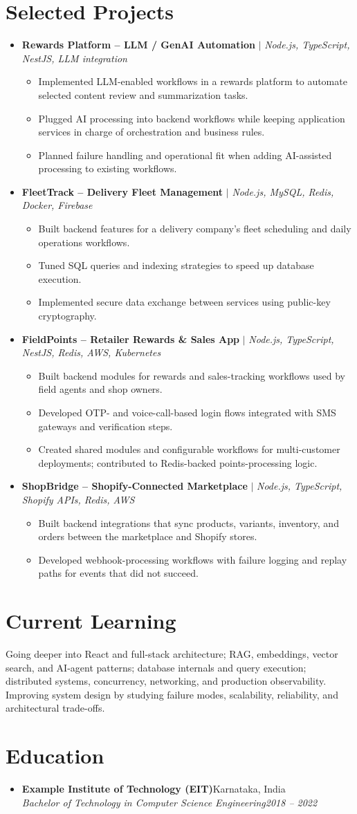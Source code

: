 \documentclass[letterpaper,10pt]{article}
\newcommand{\itemx}[1]{\item\small{#1\vspace{-2pt}}}
\newcommand{\subheading}[4]{\item \textbf{#1}\hfill #2\\\textit{\small #3}\hfill\textit{\small #4}\vspace{-5pt}}
\newcommand{\project}[2]{\item \small{\textbf{#1} $|$ \emph{#2}}\vspace{-5pt}}
\begin{document}
\section{Selected Projects}
\begin{itemize}[leftmargin=.15in,label={}]
\project{Rewards Platform -- LLM / GenAI Automation}{Node.js, TypeScript, NestJS, LLM integration}
\begin{itemize}[leftmargin=.18in]
\itemx{Implemented LLM-enabled workflows in a rewards platform to automate selected content review and summarization tasks.}
\itemx{Plugged AI processing into backend workflows while keeping application services in charge of orchestration and business rules.}
\itemx{Planned failure handling and operational fit when adding AI-assisted processing to existing workflows.}
\end{itemize}
\project{FleetTrack -- Delivery Fleet Management}{Node.js, MySQL, Redis, Docker, Firebase}
\begin{itemize}[leftmargin=.18in]
\itemx{Built backend features for a delivery company's fleet scheduling and daily operations workflows.}
\itemx{Tuned SQL queries and indexing strategies to speed up database execution.}
\itemx{Implemented secure data exchange between services using public-key cryptography.}
\end{itemize}
\project{FieldPoints -- Retailer Rewards \& Sales App}{Node.js, TypeScript, NestJS, Redis, AWS, Kubernetes}
\begin{itemize}[leftmargin=.18in]
\itemx{Built backend modules for rewards and sales-tracking workflows used by field agents and shop owners.}
\itemx{Developed OTP- and voice-call-based login flows integrated with SMS gateways and verification steps.}
\itemx{Created shared modules and configurable workflows for multi-customer deployments; contributed to Redis-backed points-processing logic.}
\end{itemize}
\project{ShopBridge -- Shopify-Connected Marketplace}{Node.js, TypeScript, Shopify APIs, Redis, AWS}
\begin{itemize}[leftmargin=.18in]
\itemx{Built backend integrations that sync products, variants, inventory, and orders between the marketplace and Shopify stores.}
\itemx{Developed webhook-processing workflows with failure logging and replay paths for events that did not succeed.}
\end{itemize}
\end{itemize}

\section{Current Learning}
\small{Going deeper into React and full-stack architecture; RAG, embeddings, vector search, and AI-agent patterns; database internals and query execution; distributed systems, concurrency, networking, and production observability. Improving system design by studying failure modes, scalability, reliability, and architectural trade-offs.}

\section{Education}
\begin{itemize}[leftmargin=.15in,label={}]
\subheading{Example Institute of Technology (EIT)}{Karnataka, India}{Bachelor of Technology in Computer Science Engineering}{2018 -- 2022}
\end{itemize}
\end{document}
